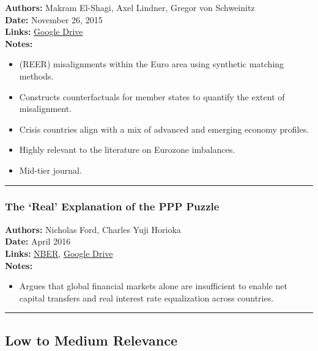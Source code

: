 \documentclass[
  11pt,
]{article}
\providecommand{\tightlist}{%
  \setlength{\itemsep}{0pt}\setlength{\parskip}{0pt}}
\begin{document}
\textbf{Authors:} Makram El-Shagi, Axel Lindner, Gregor von Schweinitz\\
\textbf{Date:} November 26, 2015\\
\textbf{Links:}
\href{https://drive.google.com/file/d/1rg_R7y6ti0Y7HCTl6L9Alxj7nUcQf6Cn/view?usp=sharing}{Google
Drive}\\
\textbf{Notes:}

\begin{itemize}
\tightlist
\item
  (REER) misalignments within the Euro area using synthetic matching
  methods.
\item
  Constructs counterfactuals for member states to quantify the extent of
  misalignment.
\item
  Crisis countries align with a mix of advanced and emerging economy
  profiles.
\item
  Highly relevant to the literature on Eurozone imbalances.
\item
  Mid-tier journal.
\end{itemize}

\begin{center}\rule{0.5\linewidth}{0.5pt}\end{center}

\subsubsection{The `Real' Explanation of the PPP
Puzzle}\label{the-real-explanation-of-the-ppp-puzzle}

\textbf{Authors:} Nicholas Ford, Charles Yuji Horioka\\
\textbf{Date:} April 2016\\
\textbf{Links:} \href{http://www.nber.org/papers/w22198}{NBER},
\href{https://drive.google.com/file/d/1dIKOGSL5vl_e6A86TPpEyXVHKGyGa3yG/view?usp=sharing}{Google
Drive}\\
\textbf{Notes:}

\begin{itemize}
\tightlist
\item
  Argues that global financial markets alone are insufficient to enable
  net capital transfers and real interest rate equalization across
  countries.
\end{itemize}

\begin{center}\rule{0.5\linewidth}{0.5pt}\end{center}

\subsection{Low to Medium Relevance}\label{low-to-medium-relevance}
\end{document}

